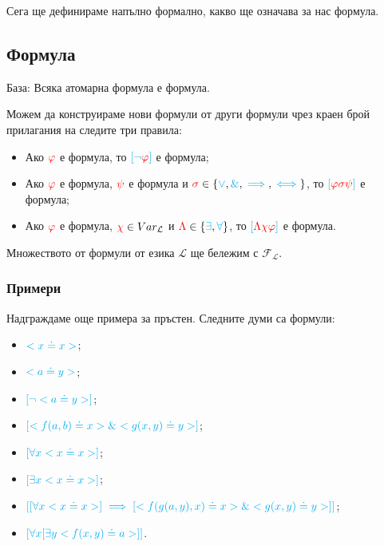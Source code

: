 \documentclass{article}[12pt]
\newcommand{\Lang}{\mathcal{L}}
\begin{document}
Сега ще дефинираме напълно формално, какво ще означава за нас формула.

\subsection{Формула}

База: Всяка атомарна формула е формула.

Можем да конструираме нови формули от други формули
чрез краен брой прилагания на следите три правила:

\begin{itemize}
\item Ако \(\color{red} \varphi\) е формула,
то \(\color{cyan} [ \neg \color{red} \varphi \color{cyan} ]\) е формула;
\item Ако \(\color{red} \varphi\) е формула,
\(\color{red} \psi\) е формула и \(\color{red} \sigma \color{black} \in \{\color{cyan} \lor \color{black} , \color{cyan} \& \color{black} , \color{cyan}\implies \color{black} , \color{cyan}\iff \color{black} \}\),
то \(\color{cyan} [ \color{red} \varphi \sigma \psi \color{cyan} ]\) е формула;
\item Ако \(\color{red} \varphi\) е формула, \(\color{red} \chi \color{black} \in Var_\Lang\) и \(\color{red} \Lambda \color{black} \in \{\color{cyan} \exists \color{black} , \color{cyan} \forall \color{black} \}\),
то \(\color{cyan} [ \color{red} \Lambda \chi \varphi \color{cyan} ]\) е формула.
\end{itemize}

Множеството от формули от езика \(\Lang\) ще бележим с \(\mathcal{F}_\Lang\).

\subsubsection{Примери}

Надграждаме още примера за пръстен. Следните думи са формули:

\begin{itemize}
\item \(\color{cyan} < x \doteq x >\);
\item \(\color{cyan} < a \doteq y >\);
\item \(\color{cyan} [\lnot < a \doteq y > ]\);
\item \(\color{cyan} [ < f(a, b) \doteq x > \& < g(x, y) \doteq y > ]\);
\item \(\color{cyan} [\forall x < x \doteq x > ]\);
\item \(\color{cyan} [\exists x < x \doteq x > ]\);
\item \(\color{cyan} [ [\forall x < x \doteq x > ] \implies [ < f(g(a, y), x) \doteq x > \& < g(x, y) \doteq y > ] ]\);
\item \(\color{cyan} [\forall x [\exists y <f(x, y) \doteq a>]]\).
\end{itemize}
\end{document}
